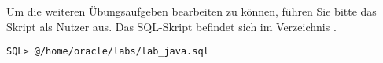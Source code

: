       \item Um die weiteren \"Ubungsaufgeben bearbeiten zu k\"onnen, f\"uhren Sie bitte das Skript  als Nutzer  aus. Das SQL-Skript befindet sich im Verzeichnis .
        \begin{lstlisting}[language=terminal]
SQL> @/home/oracle/labs/lab_java.sql
        \end{lstlisting}
